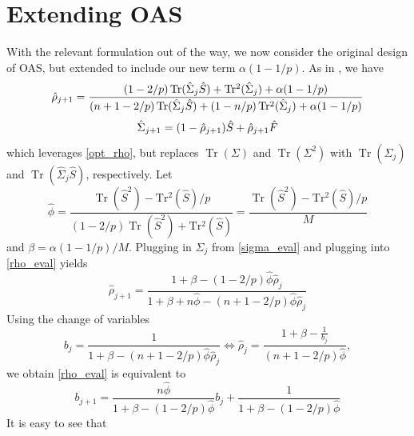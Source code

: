 \documentclass[10pt,twoside,titlepage]{article}   %
\begin{document}
\section{Extending OAS}\label{sec-extension}
With the relevant formulation out of the way, we now consider the original design of OAS, but extended to include our new term $\alpha (1 - 1/p)$.
As in \cite{OAS}, we have
\begin{equation}
\label{rho_eval}
\hat{\rho}_{j+1} = \frac{ (1-2/p) \operatorname{Tr}(\hat{\Sigma}_j \hat{S} ) + \operatorname{Tr^2}( \hat{\Sigma}_j ) + \alpha (1 - 1/p) }{ (n+1-2/p) \operatorname{Tr}( \hat{\Sigma}_j \hat{S} ) + (1 - n/p) \operatorname{Tr^2}( \hat{\Sigma}_j ) + \alpha (1 - 1/p) } \\
\end{equation}
\begin{equation}
\label{sigma_eval}
\hat{\Sigma}_{j+1} = (1 - \hat{\rho}_{j+1}) \hat{S} + \hat{\rho}_{j+1} \hat{F} \\
\end{equation}
which leverages \eqref{opt_rho}, but replaces $\operatorname{Tr}(\Sigma)$ and $\operatorname{Tr}(\Sigma^2)$ with 
$\operatorname{Tr}(\hat{\Sigma}_j)$ and $\operatorname{Tr}(\hat{\Sigma}_j \hat{S})$, respectively.
Let
\begin{equation}
\hat{\phi} = \frac{ \operatorname{Tr}( \hat{S}^2 ) - \operatorname{Tr^2}( \hat{S} ) / p }{ (1-2/p) \operatorname{Tr}( \hat{S}^2 ) + \operatorname{Tr^2}( \hat{S} ) } = \frac{ \operatorname{Tr}( \hat{S}^2 ) - \operatorname{Tr^2}( \hat{S} ) / p }{ M }
\end{equation}
and $\beta = \alpha (1 -  1/p) / M$.
Plugging in $\Sigma_j$ from \eqref{sigma_eval} and plugging into \eqref{rho_eval} yields
\begin{equation}
\hat{\rho}_{j+1} = \frac{ 1 + \beta - (1 - 2/p) \hat{\phi} \hat{\rho}_j }{ 1 + \beta + n \hat{\phi} - (n+1-2/p) \hat{\phi} \hat{\rho}_j }
\end{equation}
Using the change of variables
\begin{equation}
b_j  = \frac{1}{ 1 + \beta - (n+1-2/p) \hat{\phi} \hat{\rho}_j } \Leftrightarrow \hat{\rho}_j = \frac{ 1 + \beta - \frac{1}{b_j} }{ (n+1-2/p) \hat{\phi} },
\end{equation}
we obtain \eqref{rho_eval} is equivalent to
\begin{equation}
b_{j+1} =  \frac{  n \hat{\phi} }{ 1 + \beta - (1-2/p) \hat{\phi} } b_j + \frac{ 1 }{  1 + \beta - (1-2/p) \hat{\phi} }
\end{equation}
It is easy to see that
\end{document}
